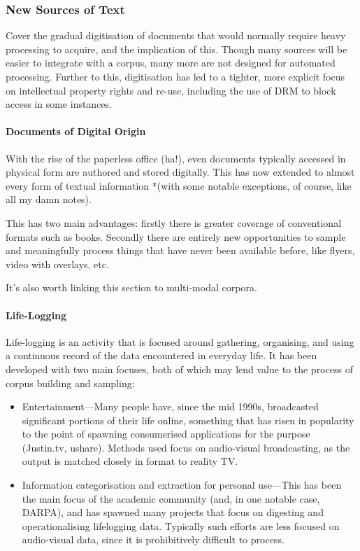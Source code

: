 

\subsubsection{New Sources of Text}
Cover the gradual digitisation of documents that would normally require heavy processing to acquire, and the implication of this.  Though many sources will be easier to integrate with a corpus, many more are not designed for automated processing.  Further to this, digitisation has led to a tighter, more explicit focus on intellectual property rights and re-use, including the use of DRM to block access in some instances.

\paragraph{Documents of Digital Origin}
With the rise of the paperless office (ha!), even documents typically accessed in physical form are authored and stored digitally.  This has now extended to almost every form of textual information *(with some notable exceptions, of course, like all my damn notes).

This has two main advantages: firstly there is greater coverage of conventional formats such as books.  Secondly there are entirely new opportunities to sample and meaningfully process things that have never been available before, like flyers, video with overlays, etc.

It's also worth linking this section to multi-modal corpora.



\paragraph{Life-Logging}
Life-logging is an activity that is focused around gathering, organising, and using a continuous record of the data encountered in everyday life.  It has been developed with two main focuses, both of which may lend value to the process of corpus building and sampling:

\begin{itemize}
    \item Entertainment---Many people have, since the mid 1990s, broadcasted significant portions of their life online, something that has risen in popularity to the point of spawning consumerised applications for the purpose (Justin.tv, ushare).  Methods used focus on audio-visual broadcasting, as the output is matched closely in format to reality TV.
    \item Information categorisation and extraction for personal use---This has been the main focus of the academic community (and, in one notable case, DARPA), and has spawned many projects that focus on digesting and operationalising lifelogging data.  Typically such efforts are less focused on audio-visual data, since it is prohibitively difficult to process.
\end{itemize}



